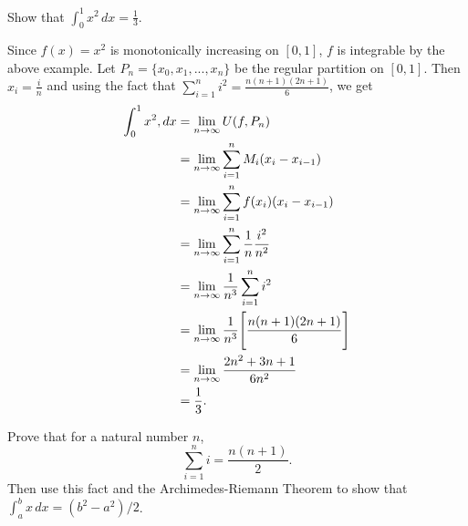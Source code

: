 \documentclass[letterpaper, twoside, 12pt]{book}
\begin{document}
\begin{example}[6.11]
  Show that \(\int_0^1 x^2\,dx=\frac{1}{3}\).
\end{example}

\begin{solution}
    Since \(f(x) = x^2\) is monotonically increasing on \([0,1]\), 
    \(f\) is integrable by the above example. Let 
    \(P_{n} = \{x_{0}, x_{1}, ..., x_{n}\}\) be the regular partition 
    on \([0,1]\). Then \(x_i = \frac{i}{n}\) and using the fact that
    \(\sum_{i=1}^{n} i^2 = \frac{n(n +1)(2n+1)}{6}\), we get
    \begin{align*}
        \int_0^1 x^2, dx&= \lim_{n \to \infty} U(f, P_n) \\
                        &= \lim_{n \to \infty} \sum_{i = 1}^n M_i (x_i - x_{i-1}) \\
                        &= \lim_{n \to \infty} \sum_{i = 1}^n f(x_{i}) (x_i - x_{i-1}) \\
                        &= \lim_{n \to \infty} \sum_{i = 1}^n \frac{1}{n} \frac{i^2}{n^2} \\
                        &= \lim_{n \to \infty} \frac{1}{n^3} \sum_{i = 1}^n i^2 \\
                        &= \lim_{n \to \infty} \frac{1}{n^3} \Bigg [ \frac{n(n+1)(2n+1)}{6} \Bigg ]\\
                        &= \lim_{n \to \infty} \frac{2n^2 + 3n + 1}{6n^2} \\
                        &= \frac{1}{3} .\\
    \end{align*}
\end{solution}

\begin{exercise}[4]
  Prove that for a natural number \(n\),
  \[ \sum_{i=1}^n i = \frac{n(n+1)}{2} .\]
  Then use this fact and the Archimedes-Riemann Theorem to show that
  \(\int_a^b x\,dx=(b^2-a^2)/2\).
\end{exercise}
\end{document}
